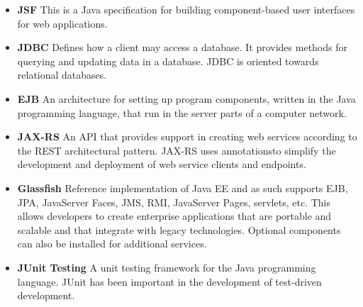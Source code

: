 \begin{itemize}
		\item \textbf{JSF} This is a Java specification for building component-based user interfaces for web applications.
			
			\item \textbf{JDBC} Defines how a client may access a database. It provides methods for querying and updating data in a database. JDBC is oriented towards relational databases.
			
			\item \textbf{EJB} An architecture for setting up program components, written in the Java programming language, that run in the server parts of a computer network.
			
			\item \textbf{JAX-RS} An API that provides support in creating web services according to the REST architectural pattern. JAX-RS uses annotationsto simplify the development and deployment of web service clients and endpoints.
			
			\item \textbf{Glassfish}  Reference implementation of Java EE and as such supports EJB, JPA, JavaServer Faces, JMS, RMI, JavaServer Pages, servlets, etc. This allows developers to create enterprise applications that are portable and scalable and that integrate with legacy technologies. Optional components can also be installed for additional services.
			
			\item \textbf{JUnit Testing} A unit testing framework for the Java programming language. JUnit has been important in the development of test-driven development.
		
\end{itemize}